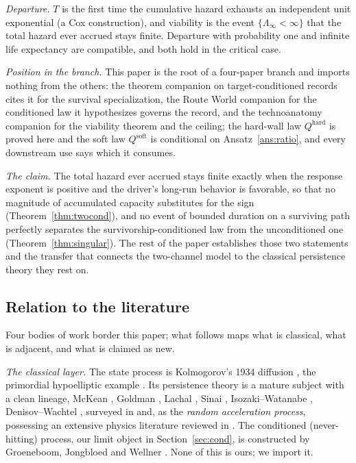 \emph{Departure.} $T$ is the first time the cumulative hazard exhausts
an independent unit exponential (a Cox construction), and viability is
the event $\{\Lambda_\infty<\infty\}$ that the total hazard ever
accrued stays finite. Departure with probability one and infinite life
expectancy are compatible, and both hold in the critical case.

\emph{Position in the branch.} This paper is the root of a four-paper
branch and imports nothing from the others: the theorem companion on
target-conditioned records cites it for the survival specialization,
the Route World companion for the conditioned law it hypothesizes
governs the record, and the technoanatomy companion for the viability
theorem and the ceiling; the hard-wall law $Q^{\mathrm{hard}}$ is
proved here and the soft law $Q^{\mathrm{soft}}$ is conditional on
Ansatz~\ref{ans:ratio}, and every downstream use says which it consumes.

\emph{The claim.} The total hazard ever accrued stays finite exactly when
the response exponent is positive and the driver's long-run behavior is
favorable, so that no magnitude of accumulated capacity substitutes for
the sign (Theorem~\ref{thm:twocond}), and no event of bounded duration on a
surviving path perfectly separates the survivorship-conditioned law
from the unconditioned one (Theorem~\ref{thm:singular}). The rest of the
paper establishes those two statements and the transfer that connects
the two-channel model to the classical persistence theory they rest
on.

\subsection{Relation to the literature}
Four bodies of work border this paper; what follows maps what is
classical, what is adjacent, and what is claimed as new.

\emph{The classical layer.} The state process is Kolmogorov's 1934
diffusion \cite{Kol34}, the primordial hypoelliptic example
\cite{Hor67}. Its persistence theory is a mature subject with a clean
lineage, McKean \cite{McK63}, Goldman \cite{Gol71}, Lachal
\cite{Lac91}, Sinai \cite{Sin92}, Isozaki--Watanabe \cite{IW94},
Denisov--Wachtel \cite{DW15}, surveyed in \cite{AS15} and, as the
\emph{random acceleration process}, possessing an extensive physics
literature reviewed in \cite{BMS13}. The conditioned (never-hitting)
process, our limit object in Section~\ref{sec:cond}, is constructed by
Groeneboom, Jongbloed and Wellner \cite{GJW99}. None of this is ours;
we import it.

